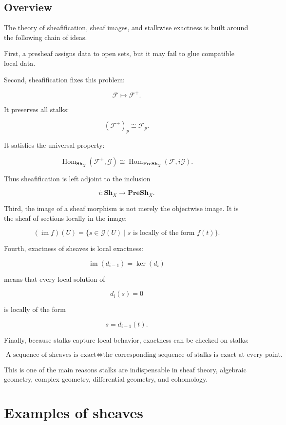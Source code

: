 \documentclass[12pt,a4paper]{article}
\DeclareMathOperator{\im}{im}
\DeclareMathOperator{\Hom}{Hom}
\newcommand{\PreSh}{\mathbf{PreSh}}
\newcommand{\Sh}{\mathbf{Sh}}
\theoremstyle{notespace}
\begin{document}
\subsection*{Overview}
The theory of sheafification, sheaf images, and stalkwise exactness is built
around the following chain of ideas.

First, a presheaf assigns data to open sets, but it may fail to glue compatible
local data.

Second, sheafification fixes this problem:

\[
\mathcal F \longmapsto \mathcal F^+.
\]

It preserves all stalks:

\[
(\mathcal F^+)_p\cong \mathcal F_p.
\]

It satisfies the universal property:

\[
\Hom_{\Sh_X}(\mathcal F^+,\mathcal G)
\cong
\Hom_{\PreSh_X}(\mathcal F,i\mathcal G).
\]

Thus sheafification is left adjoint to the inclusion

\[
i:\Sh_X\to\PreSh_X.
\]

Third, the image of a sheaf morphism is not merely the objectwise image.
It is the sheaf of sections locally in the image:

\[
(\im f)(U)
=
\{s\in\mathcal G(U)
\mid
s \text{ is locally of the form } f(t)\}.
\]

Fourth, exactness of sheaves is local exactness:

\[
\im(d_{i-1})=\ker(d_i)
\]

means that every local solution of

\[
d_i(s)=0
\]

is locally of the form

\[
s=d_{i-1}(t).
\]

Finally, because stalks capture local behavior, exactness can be checked on
stalks:

\[
\boxed{
	\text{A sequence of sheaves is exact}
	\iff
	\text{the corresponding sequence of stalks is exact at every point.}
}
\]

This is one of the main reasons stalks are indispensable in sheaf theory,
algebraic geometry, complex geometry, differential geometry, and cohomology.


	
	\section{Examples of sheaves}
	
\end{document}
